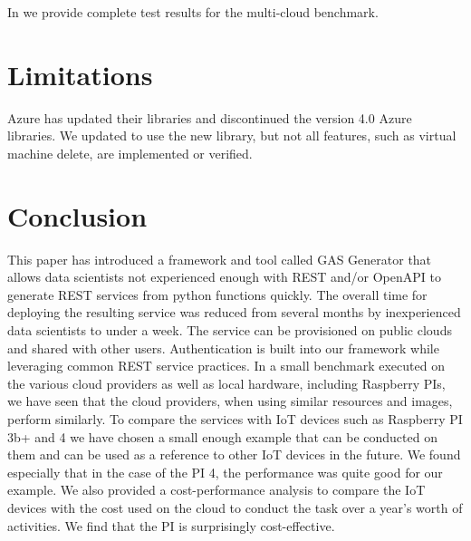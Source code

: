 In  we provide complete test results for the multi-cloud benchmark.

\section{Limitations}\label{limitations}

Azure has updated their libraries and discontinued the version 4.0 Azure
libraries. We updated \Cloudmesh to use the new library, but not all
features, such as virtual machine delete, are implemented or verified.

\section{Conclusion}
\label{sec:conclusion}

This paper has introduced a framework and tool called GAS Generator that allows data scientists not experienced enough with REST and/or OpenAPI to generate REST services from python functions quickly. The overall time for deploying the resulting service was reduced from several months by inexperienced data scientists to under a week. The service can be provisioned on public clouds and shared with other users. Authentication is built into our framework while leveraging common REST service practices. 
In a small benchmark executed on the various cloud providers as well as local hardware, including Raspberry PIs, we have seen that the cloud providers, when using similar resources and images, perform similarly. To compare the services with IoT devices such as Raspberry PI 3b+ and 4 we have chosen a small enough example that can be conducted on them and can be used as a reference to other IoT devices in the future. We found especially that in the case of the PI 4, the performance was quite good for our example. We also provided a cost-performance analysis to compare the IoT devices with the cost used on the cloud to conduct the task over a year's worth of activities. We find that the PI is surprisingly cost-effective.


